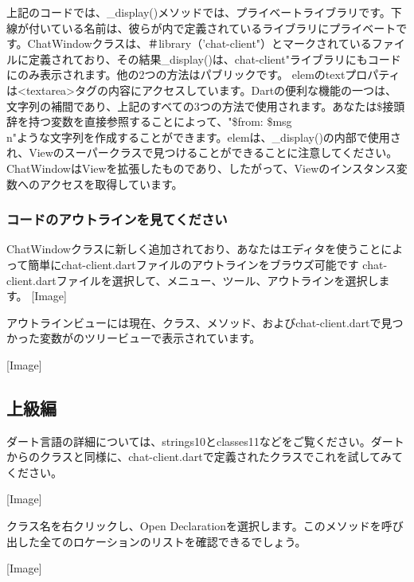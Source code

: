 上記のコードでは、\_display()メソッドでは、プライベートライブラリです。下線が付いている名前は、彼らが内で定義されているライブラリにプライベートです。ChatWindowクラスは、＃library（'chat-client"）とマークされているファイルに定義されており、その結果\_display()は、chat-client"ライブラリにもコードにのみ表示されます。他の2つの方法はパブリックです。
elemのtextプロパティは<textarea>タグの内容にアクセスしています。Dartの便利な機能の一つは、文字列の補間であり、上記のすべての3つの方法で使用されます。あなたは\$接頭辞を持つ変数を直接参照することによって、"\$from: \$msg\\n"ような文字列を作成することができます。elemは、\_display()の内部で使用され、Viewのスーパークラスで見つけることができることに注意してください。ChatWindowはViewを拡張したものであり、したがって、Viewのインスタンス変数へのアクセスを取得しています。

\subsubsection{コードのアウトラインを見てください}

ChatWindowクラスに新しく追加されており、あなたはエディタを使うことによって簡単にchat-client.dartファイルのアウトラインをブラウズ可能です
chat-client.dartファイルを選択して、メニュー、ツール、アウトラインを選択します。
[Image]

アウトラインビューには現在、クラス、メソッド、およびchat-client.dartで見つかった変数がのツリービューで表示されています。

[Image]

\subsection{上級編}

ダート言語の詳細については、strings10とclasses11などをご覧ください。ダートからのクラスと同様に、chat-client.dartで定義されたクラスでこれを試してみてください。

[Image]

クラス名を右クリックし、Open Declarationを選択します。このメソッドを呼び出した全てのロケーションのリストを確認できるでしょう。

[Image]
